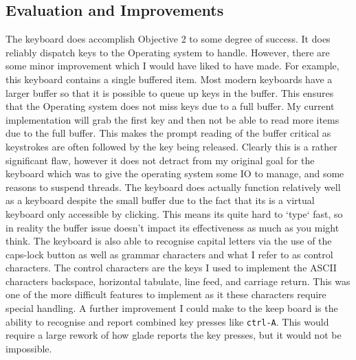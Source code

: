 \subsection{Evaluation and Improvements}
The keyboard does accomplish Objective 2 to some degree of success. It does reliably dispatch keys to the Operating system to handle. However, there are some minor improvement which I would have liked to have made. For example, this keyboard contains a single buffered item. Most modern keyboards have a larger buffer so that it is possible to queue up keys in the buffer. This ensures that the Operating system does not miss keys due to a full buffer. My current implementation will grab the first key and then not be able to read more items due to the full buffer. This makes the prompt reading of the buffer critical as keystrokes are often followed by the key being released. Clearly this is a rather significant flaw, however it does not detract from my original goal for the keyboard which was to give the operating system some IO to manage, and some reasons to suspend threads. The keyboard does actually function relatively well as a keyboard despite the small buffer due to the fact that its is a virtual keyboard only accessible by clicking. This means its quite hard to `type` fast, so in reality the buffer issue doesn't impact its effectiveness as much as you might think. The keyboard is also able to recognise capital letters via the use of the caps-lock button as well as grammar characters and what I refer to as control characters. The control characters are the keys I used to implement the ASCII characters backspace, horizontal tabulate, line feed, and carriage return. This was one of the more difficult features to implement as it these characters require special handling.
A further improvement I could make to the keep board is the ability to recognise and report combined key presses like \verb|ctrl-A|. This would require a large rework of how glade reports the key presses, but it would not be impossible. 